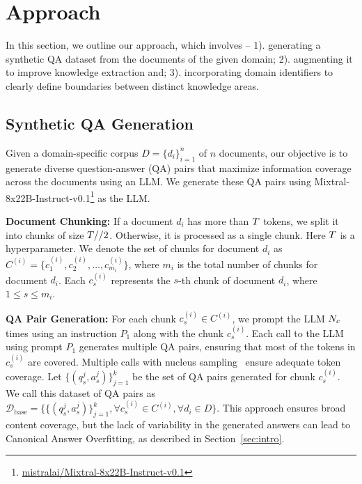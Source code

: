 \section{Approach}
\label{sec:approach}

In this section, we outline our approach, which involves --
1). generating a synthetic QA dataset from the documents of the given domain;
2). augmenting it to improve knowledge extraction and;
3). incorporating domain identifiers to clearly define boundaries between distinct knowledge areas.

\subsection{Synthetic QA Generation}
\label{subsec:synthetic_qa_generation}
Given a domain-specific corpus $D= \{d_i\}_{i=1}^{n}$ of $n$ documents, our objective is to generate diverse question-answer (QA) pairs that maximize information coverage across the documents using an LLM. We generate these QA pairs using Mixtral-8x22B-Instruct-v0.1\footnote{\href{https://huggingface.co/mistralai/Mixtral-8x22B-Instruct-v0.1}{mistralai/Mixtral-8x22B-Instruct-v0.1}} as the LLM.

\noindent\textbf{Document Chunking:} 
If a document $d_i$ has more than $T$ tokens, we split it into chunks of size $T//2$. Otherwise, it is processed as a single chunk.
Here $T$ is a hyperparameter.
We denote the set of chunks for document $d_i$ as $C^{(i)} = \{c^{(i)}_1, c^{(i)}_2, \dots, c^{(i)}_{m_i}\}$, where $m_i$ is the total number of chunks for document $d_i$. Each $c^{(i)}_s$ represents the $s$-th chunk of document $d_i$, where $1 \leq s \leq m_i$.

\noindent\textbf{QA Pair Generation:} 
For each chunk $c^{(i)}_s \in C^{(i)}$, we prompt the LLM $N_c$ times using an instruction $P_1$ along with the chunk $c^{(i)}_s$. 
Each call to the LLM using prompt $P_1$ generates multiple QA pairs, ensuring that most of the tokens in $c^{(i)}_s$ are covered. Multiple calls with nucleus sampling~\cite{holtzmancurious} ensure adequate token coverage. 
Let $\{(q_s^j, a_s^j)\}_{j=1}^{k}$ be the set of QA pairs generated for chunk $c^{(i)}_s$.
We call this dataset of QA pairs as $\mathcal{D}_{\text{base}} = 
\{ \{(q_s^j, a_s^j)\}_{j=1}^{k}, \forall c^{(i)}_s \in C^{(i)}, \forall d_i \in D\}.$
This approach ensures broad content coverage, but the lack of variability in the generated answers can lead to Canonical Answer Overfitting, as described in Section~\ref{sec:intro}.

